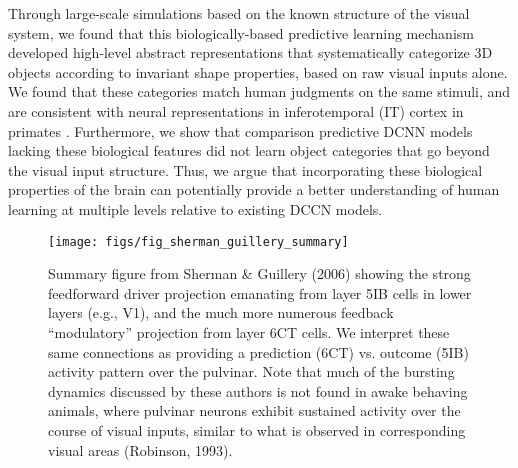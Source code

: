 \documentclass[12pt,twoside,lineno]{pnas-new}  %
\begin{document}
Through large-scale simulations based on the known structure of the visual system, we found that this biologically-based predictive learning mechanism developed high-level abstract representations that systematically categorize 3D objects according to invariant shape properties, based on raw visual inputs alone.  We found that these categories match human judgments on the same stimuli, and are consistent with neural representations in inferotemporal (IT) cortex in primates \cite{CadieuHongYaminsEtAl14}.  Furthermore, we show that comparison predictive DCNN models lacking these biological features \cite{LotterKreimanCox16} did not learn object categories that go beyond the visual input structure.  Thus, we argue that incorporating these biological properties of the brain can potentially provide a better understanding of human learning at multiple levels relative to existing DCCN models.

\begin{figure}
  \centering\texttt{[image: figs/fig\_sherman\_guillery\_summary]}
  \caption{Summary figure from Sherman \& Guillery (2006) showing the strong feedforward driver projection emanating from layer 5IB cells in lower layers (e.g., V1), and the much more numerous feedback ``modulatory'' projection from layer 6CT cells.  We interpret these same connections as providing a prediction (6CT) vs. outcome (5IB) activity pattern over the pulvinar.  Note that much of the bursting dynamics discussed by these authors is not found in awake behaving animals, where pulvinar neurons exhibit sustained activity over the course of visual inputs, similar to what is observed in corresponding visual areas (Robinson, 1993).}
  \label{fig.sg06}
\end{figure}
\end{document}
